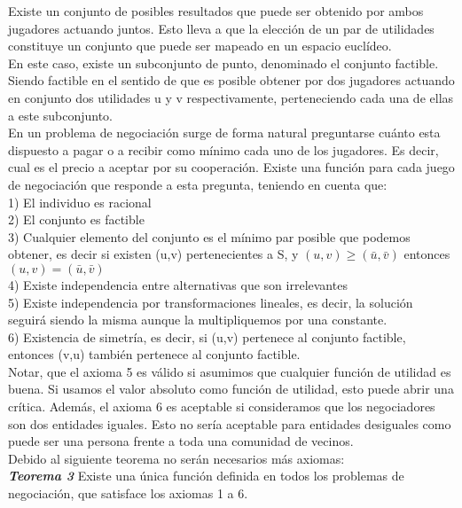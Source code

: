 \documentclass[10pt,a4paper]{book}
\begin{document}
Existe un conjunto de posibles resultados que puede ser obtenido por ambos jugadores actuando juntos. Esto lleva a que la elección de un par de utilidades constituye un conjunto que puede ser mapeado en un espacio euclídeo.\\


En este caso, existe un subconjunto de punto, denominado el conjunto factible. Siendo factible en el sentido de que es posible obtener por dos jugadores actuando en conjunto dos utilidades u y v respectivamente, perteneciendo cada una de ellas a este subconjunto.\\

En un problema de negociación surge de forma natural preguntarse cuánto esta dispuesto a pagar o a recibir como mínimo cada uno de los jugadores. Es decir, cual es el precio a aceptar por su cooperación. Existe una función para cada juego de negociación que responde a esta pregunta, teniendo en cuenta que:\\

1)	El individuo es racional\\
2)	El conjunto es factible\\
3)	Cualquier elemento del conjunto es el mínimo par posible que podemos obtener, es decir si existen (u,v) pertenecientes a S, y $(u,v) \geq (\bar{u},\bar{v})$ entonces $(u,v)=(\bar{u},\bar{v})$\\
4)	Existe independencia entre alternativas que son irrelevantes\\
5)	Existe independencia por transformaciones lineales, es decir, la solución seguirá siendo la misma aunque la multipliquemos por una constante.\\
6)	Existencia de simetría, es decir, si (u,v) pertenece al conjunto factible, entonces (v,u) también pertenece al conjunto factible.\\

Notar, que el axioma 5 es válido si asumimos que cualquier función de utilidad es buena. Si usamos el valor absoluto como función de utilidad, esto puede abrir una crítica. Además, el axioma 6 es aceptable si consideramos que los negociadores son dos entidades iguales. Esto no sería aceptable para entidades desiguales como puede ser una persona frente a toda una comunidad de vecinos.\\

Debido al siguiente teorema no serán necesarios más axiomas:\\

\textit{\textbf{Teorema 3}} Existe una única función definida en todos los problemas de negociación, que satisface los axiomas 1 a 6.\\
\end{document}
